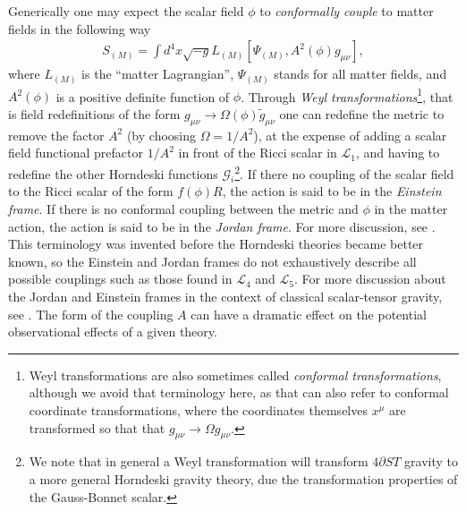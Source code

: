 \documentclass{ws-ijmpd}
\begin{document}
Generically one may expect the scalar field $\phi$ to 
\emph{conformally couple} to 
matter fields in the following way\cite{fujii_maeda_2003,will_2018} 
\begin{align}
   S_{(M)}
   =
   \int d^4x\sqrt{-g}L_{(M)}\left[
      \Psi_{(M)},A^2\left(\phi\right)g_{\mu\nu}
   \right]
   ,
\end{align}
where $L_{(M)}$ is the ``matter Lagrangian'', $\Psi_{(M)}$ stands for
all matter fields, and $A^2\left(\phi\right)$
is a positive definite function of $\phi$.
Through \emph{Weyl transformations}\footnote{Weyl transformations
are also sometimes called \emph{conformal transformations},
although we avoid that terminology here, as that 
can also refer to conformal coordinate transformations, where the
coordinates themselves $x^{\mu}$ are transformed so that that
$g_{\mu\nu}\to\Omega g_{\mu\nu}$.}, that is field redefinitions
of the form $g_{\mu\nu}\to\Omega\left(\phi\right)\tilde{g}_{\mu\nu}$
one can redefine the metric to remove the factor $A^2$
(by choosing $\Omega=1/A^2$),
at the expense of adding a scalar field functional prefactor
$1/A^2$ in front of the Ricci scalar in $\mathcal{L}_1$,
and having to redefine the other Horndeski functions 
$\mathcal{G}_i$\footnote{We
note that in general a Weyl transformation will transform $4\partial ST$
gravity to a more general Horndeski gravity theory, 
due the transformation properties of the 
Gauss-Bonnet scalar\cite{Maeda:2009uy}.}.
If there no coupling of the scalar field to
the Ricci scalar of the form $f\left(\phi\right)R$, the action
is said to be in the \emph{Einstein frame}\cite{Hawking:1972qk}.
If there is no conformal coupling between the metric and $\phi$
in the matter action, the action is said to be in the
\emph{Jordan frame}.
For more discussion, see .
This terminology
was invented before the Horndeski theories became better known,
so the Einstein and Jordan frames do not exhaustively describe all
possible couplings such as those found in $\mathcal{L}_4$ and $\mathcal{L}_5$.
For more discussion about the Jordan and Einstein frames
in the context of classical scalar-tensor gravity, see .
The form of the coupling $A$
can have a dramatic effect on the potential observational effects
of a given theory\cite{Damour:1996ke,fujii_maeda_2003,Will:2014kxa,will_2018}. 
\end{document}

